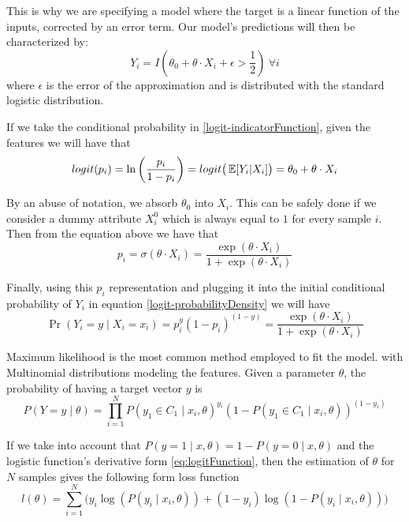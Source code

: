 This is why we are specifying a model where the target is a linear function of the inputs, corrected by an error term.
Our model's predictions will then be characterized by:
\begin{equation}
Y_i = I(\theta_0 + \theta \cdot X_i + \epsilon > \frac{1}{2}) \ \forall i
\label{logit-indicatorFunction}
\end{equation}
where $\epsilon$ is the error of the approximation and is distributed with the standard logistic distribution.

If we take the conditional probability in \cref{logit-indicatorFunction}, given the features we will have that
\begin{equation}
logit(p_i)= \ln \left(\frac{p_i}{1-p_i} \right) = logit\big( \operatorname{\mathbb{E}}[Y_i| X_i] \big) = \theta_0 + \theta \cdot X_i
\end{equation}

By an abuse of notation, we absorb $\theta_0$ into $X_i$.
This can be safely done if we consider a dummy attribute $X_i^0$ which is always equal to $1$ for every sample $i$.
Then from the equation above we have that
\begin{equation}
p_i = \sigma(\theta \cdot X_i) = \frac{\exp(\theta \cdot X_i) }{1 + \exp(\theta \cdot X_i)}
\end{equation}

Finally, using this $p_i$ representation and plugging it into the initial conditional probability of $Y_i$ in equation \cref{logit-probabilityDensity} we will have
\begin{equation}
 \Pr(Y_i=y \mid X_i = x_i) = p_i^{y} {(1-p_i)}^{(1-y)} = \frac{\exp(\theta \cdot X_i) }{1 + \exp(\theta \cdot X_i)}
 \end{equation}


Maximum likelihood is the most common method employed to fit the model.
with Multinomial distributions modeling the features.
Given a parameter $\theta$, the probability of having a target vector $y$ is
\begin{equation}
P(Y =y \mid \theta ) = \prod_{i=1}^N {P(y_1 \in C_1 \mid x_i, \theta)}^{y_i} {(1 - P(y_1 \in C_1 \mid x_i, \theta) )}^{(1-y_i)}
\end{equation}

If we take into account that $P(y=1 \mid x,\theta) = 1 - P(y=0 \mid x,\theta)$ and the logistic function's derivative form \cref{eq:logitFunction}, then the estimation of $\theta$ for $N$ samples gives the following form
loss function
\begin{equation}
l(\theta) = \sum_{i=1}^N \big(y_i \log(P(y_i \mid x_i,\theta)) + (1-y_i)\log(1 - P(y_i \mid x_i,\theta) ) \big)
\label{eq:logLossFunction}
\end{equation}

